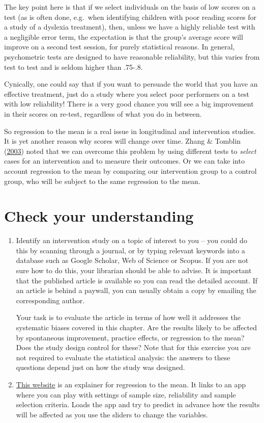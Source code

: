 \documentclass{krantz}
\begin{document}
The key point here is that if we select individuals on the basis of low scores on a test (as is often done, e.g.~when identifying children with poor reading scores for a study of a dyslexia treatment), then, unless we have a highly reliable test with a negligible error term, the expectation is that the group's average score will improve on a second test session, for purely statistical reasons. In general, psychometric tests are designed to have reasonable reliability, but this varies from test to test and is seldom higher than .75-.8.

Cynically, one could say that if you want to persuade the world that you have an effective treatment, just do a study where you select poor performers on a test with low reliability! There is a very good chance you will see a big improvement in their scores on re-test, regardless of what you do in between.

So regression to the mean is a real issue in longitudinal and intervention studies. It is yet another reason why scores will change over time. Zhang \& Tomblin (\protect\hyperlink{ref-zhang2003}{2003}) noted that we can overcome this problem by using different tests to \emph{select} cases for an intervention and to measure their outcomes. Or we can take into account regression to the mean by comparing our intervention group to a control group, who will be subject to the same regression to the mean.

\hypertarget{check-your-understanding-4}{%
\section{Check your understanding}\label{check-your-understanding-4}}

\begin{enumerate}
\def\labelenumi{\arabic{enumi}.}
\item
  Identify an intervention study on a topic of interest to you -- you could do this by scanning through a journal, or by typing relevant keywords into a database such as Google Scholar, Web of Science or Scopus. If you are not sure how to do this, your librarian should be able to advise. It is important that the published article is available so you can read the detailed account. If an article is behind a paywall, you can usually obtain a copy by emailing the corresponding author.

  Your task is to evaluate the article in terms of how well it addresses the systematic biases covered in this chapter. Are the results likely to be affected by spontaneous improvement, practice effects, or regression to the mean? Does the study design control for these? Note that for this exercise you are not required to evaluate the statistical analysis: the answers to these questions depend just on how the study was designed.
\item
  \href{https://www.andifugard.info/regression-to-the-mean/}{This website} is an explainer for regression to the mean. It links to an app where you can play with settings of sample size, reliability and sample selection criteria. Loads the app and try to predict in advance how the results will be affected as you use the sliders to change the variables.
\end{enumerate}
\end{document}
